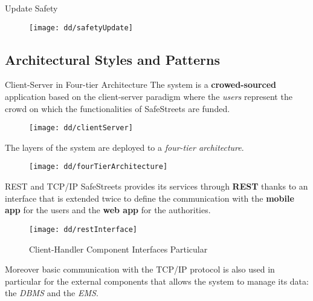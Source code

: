 		\begin{frame}{Update Safety}
			\begin{figure}[hbtp]
				\centering
				\texttt{[image: dd/safetyUpdate]}
			\end{figure}
		\end{frame}
	
	\subsection{Architectural Styles and Patterns}
		\begin{frame}{Client-Server in Four-tier Architecture}
			The system is a \textbf{crowed-sourced} application based on the client-server paradigm where the \emph{users} represent the crowd on which the functionalities of SafeStreets are funded.
			
			\begin{figure}[h!]
				\centering
				\texttt{[image: dd/clientServer]}
			\end{figure}
		
			The layers of the system are deployed to a \emph{four-tier architecture}.
			
			\begin{figure}[h]
				\centering
				\texttt{[image: dd/fourTierArchitecture]}
			\end{figure}
		\end{frame}
	
		\begin{frame}{REST and TCP/IP}
			SafeStreets provides its services through \textbf{REST} thanks to an interface that is extended twice to define the communication with the \textbf{mobile app} for the users and the \textbf{web app} for the authorities.
			
			\begin{figure}
				\begin{minipage}{0.42\textwidth}
					\centering
					\texttt{[image: dd/restInterface]}
				\end{minipage}
				\begin{minipage}{0.3\textwidth}\tiny
					\color{polimiblue}Client-Handler Component Interfaces Particular
				\end{minipage}
			\end{figure}
			
			Moreover basic communication with the TCP/IP protocol is also used in particular for the external components that allows the system to manage its data: the \emph{DBMS} and the \emph{EMS}.
		\end{frame}
		
